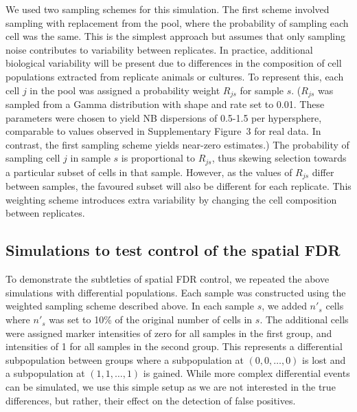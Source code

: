 \documentclass{article}
\newcommand{\suppfignbdisp}{3}
\begin{document}
We used two sampling schemes for this simulation.
The first scheme involved sampling with replacement from the pool, where the probability of sampling each cell was the same.
This is the simplest approach but assumes that only sampling noise contributes to variability between replicates.
In practice, additional biological variability will be present due to differences in the composition of cell populations extracted from replicate animals or cultures.
To represent this, each cell $j$ in the pool was assigned a probability weight $R_{js}$ for sample $s$.
($R_{js}$ was sampled from a Gamma distribution with shape and rate set to 0.01.
These parameters were chosen to yield NB dispersions of 0.5-1.5 per hypersphere, comparable to values observed in Supplementary Figure~\suppfignbdisp{} for real data.
In contrast, the first sampling scheme yields near-zero estimates.)
The probability of sampling cell $j$ in sample $s$ is proportional to $R_{js}$, thus skewing selection towards a particular subset of cells in that sample.
However, as the values of $R_{js}$ differ between samples, the favoured subset will also be different for each replicate.
This weighting scheme introduces extra variability by changing the cell composition between replicates.

\subsection{Simulations to test control of the spatial FDR}
To demonstrate the subtleties of spatial FDR control, we repeated the above simulations with differential populations.
Each sample was constructed using the weighted sampling scheme described above.
In each sample $s$, we added $n'_s$ cells where $n'_s$ was set to 10\% of the original number of cells in $s$.
The additional cells were assigned marker intensities of zero for all samples in the first group, and intensities of 1 for all samples in the second group.
This represents a differential subpopulation between groups where a subpopulation at $(0,0, \ldots, 0)$ is lost and a subpopulation at $(1, 1, \ldots, 1)$ is gained.
While more complex differential events can be simulated, we use this simple setup as we are not interested in the true differences, but rather, their effect on the detection of false positives.
\end{document}
